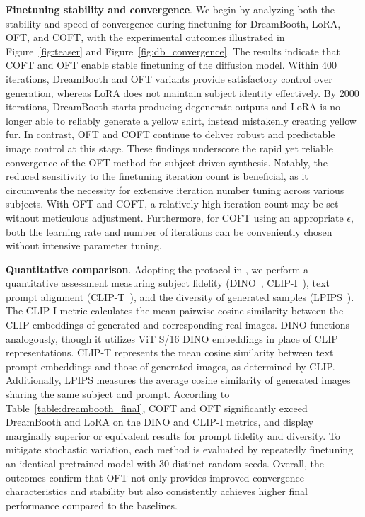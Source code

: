 \textbf{Finetuning stability and convergence}. We begin by analyzing both the stability and speed of convergence during finetuning for DreamBooth, LoRA, OFT, and COFT, with the experimental outcomes illustrated in Figure~\ref{fig:teaser} and Figure~\ref{fig:db_convergence}. The results indicate that COFT and OFT enable stable finetuning of the diffusion model. Within 400 iterations, DreamBooth and OFT variants provide satisfactory control over generation, whereas LoRA does not maintain subject identity effectively. By 2000 iterations, DreamBooth starts producing degenerate outputs and LoRA is no longer able to reliably generate a yellow shirt, instead mistakenly creating yellow fur. In contrast, OFT and COFT continue to deliver robust and predictable image control at this stage. These findings underscore the rapid yet reliable convergence of the OFT method for subject-driven synthesis. Notably, the reduced sensitivity to the finetuning iteration count is beneficial, as it circumvents the necessity for extensive iteration number tuning across various subjects. With OFT and COFT, a relatively high iteration count may be set without meticulous adjustment. Furthermore, for COFT using an appropriate $\epsilon$, both the learning rate and number of iterations can be conveniently chosen without intensive parameter tuning.

\textbf{Quantitative comparison}. Adopting the protocol in \cite{ruiz2023dreambooth}, we perform a quantitative assessment measuring subject fidelity (DINO~\cite{caron2021emerging}, CLIP-I~\cite{radford2021learning}), text prompt alignment (CLIP-T~\cite{radford2021learning}), and the diversity of generated samples (LPIPS~\cite{zhang2018unreasonable}). The CLIP-I metric calculates the mean pairwise cosine similarity between the CLIP embeddings of generated and corresponding real images. DINO functions analogously, though it utilizes ViT S/16 DINO embeddings in place of CLIP representations. CLIP-T represents the mean cosine similarity between text prompt embeddings and those of generated images, as determined by CLIP. Additionally, LPIPS measures the average cosine similarity of generated images sharing the same subject and prompt. According to Table~\ref{table:dreambooth_final}, COFT and OFT significantly exceed DreamBooth and LoRA on the DINO and CLIP-I metrics, and display marginally superior or equivalent results for prompt fidelity and diversity. To mitigate stochastic variation, each method is evaluated by repeatedly finetuning an identical pretrained model with 30 distinct random seeds. Overall, the outcomes confirm that OFT not only provides improved convergence characteristics and stability but also consistently achieves higher final performance compared to the baselines.

